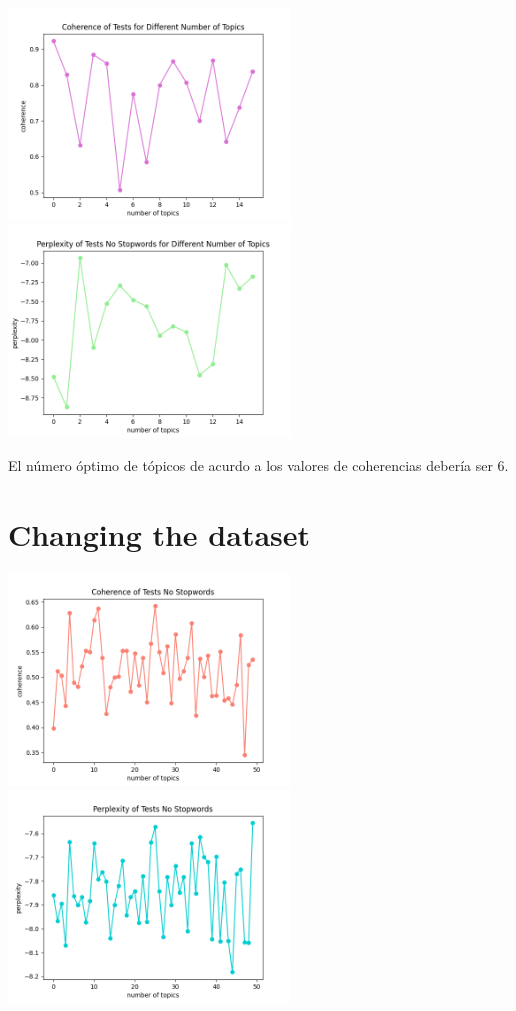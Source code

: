 \documentclass[10pt]{article} %
\begin{document}
	\begin{center}
		\includegraphics[width=7.5cm]{images/coherence_no_stopwords_diff_n_topics}
		\includegraphics[width=7.5cm]{images/perplexity_no_stopwords_diff_n_topics}
	\end{center}

	El n\'umero \'optimo de t\'opicos de acurdo a los valores de coherencias deber\'ia ser 6.
	
	\section{Changing the dataset}
	
	\begin{center}
		\includegraphics[width=7.5cm]{images/coherence_no_stopwords_2}
		\includegraphics[width=7.5cm]{images/perplexity_no_stopwords_2}
	\end{center}
	
\end{document}
